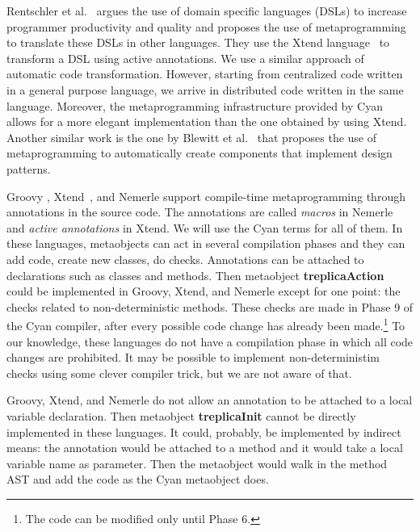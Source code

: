 \documentclass[preprint,review]{elsarticle}
\newcommand{\srcstyle}[1]{\ttfamily\textbf{#1}\rmfamily}
\begin{document}
Rentschler  et al.~\cite{rentschler2014designing}  argues  the use  of
domain specific  languages (DSLs) to increase  programmer productivity
and  quality and  proposes the  use of  metaprogramming to  translate
these    DSLs   in    other    languages.    They    use   the    Xtend
language~\cite{rentschler2014designing}  to  transform   a  DSL  using
active  annotations.  We  use  a similar  approach  of automatic  code
transformation. However, starting from centralized code written in a general
purpose language,  we arrive  in distributed code  written in  the same
language.  Moreover,  the metaprogramming infrastructure  provided by
Cyan allows for a more elegant implementation than the one obtained by
using Xtend. Another  similar work is the one by Blewitt et al.~\cite{blewitt2005automatic} that
proposes  the   use  of   metaprogramming  to   automatically  create
components that implement design patterns.

Groovy \cite{groovy2017},
Xtend~\cite{rentschler2014designing}, and
Nemerle   \cite{kamil2005} support compile-time metaprogramming through annotations in the source code. The annotations are called \textit{macros} in Nemerle and \textit{active annotations} in Xtend. We will use the Cyan terms for all of them.
In these languages, metaobjects can  act in several compilation phases
and they can add code, create new classes, do checks. Annotations can be attached to declarations such as classes and methods. Then metaobject \srcstyle{treplicaAction} could be implemented in Groovy, Xtend, and Nemerle except for one point: the checks related to non-deterministic methods. These checks are
made in Phase 9 of the Cyan compiler, after every possible code change has already been made.\footnote{The code can be modified only until Phase 6.} To our knowledge, these languages do not have a compilation phase in which all code changes are prohibited. It may be possible to implement non-deterministim checks using some clever compiler trick, but we are not aware of that.

Groovy, Xtend, and  Nemerle do not allow an annotation  to be attached
to     a    local     variable     declaration.    Then     metaobject
\srcstyle{treplicaInit}  cannot  be   directly  implemented  in  these
languages. It could, probably, be implemented by indirect means: the annotation would be attached to a method and it would take a local variable name as parameter. Then the metaobject would walk in the method AST and add the code as the Cyan metaobject does.
\end{document}
